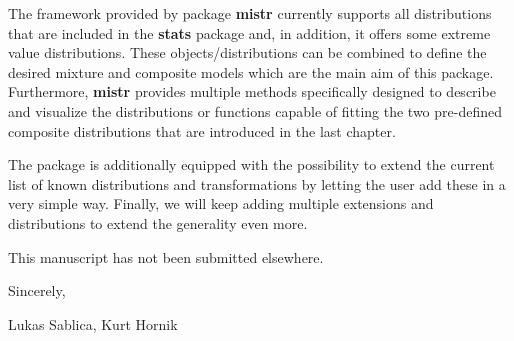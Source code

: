 \documentclass{article}
\newcommand{\pkg}[1]{\textbf{\textsf{#1}}}
\begin{document}
\vspace{0.25cm}
\noindent The framework provided by package \pkg{mistr} currently supports all distributions that are included in the \pkg{stats} package and, in addition, it offers some extreme value distributions. These objects/distributions can be combined to define  the desired mixture and composite models which are the main aim of this package. Furthermore, \pkg{mistr} provides multiple methods specifically designed to describe and visualize the distributions or functions capable of fitting the two pre-defined composite distributions that are introduced in the last chapter. 

\vspace{0.25cm}
\noindent The package is additionally equipped with the possibility to extend the current list of known distributions and transformations by letting the user add these in a very simple way. Finally, we will keep adding multiple extensions and distributions to extend the generality even more.
 
\vspace{0.25cm}
\noindent  This manuscript has not been submitted elsewhere.

\vspace{0.25cm}
\noindent Sincerely,

\noindent Lukas Sablica, Kurt Hornik
\end{document}
